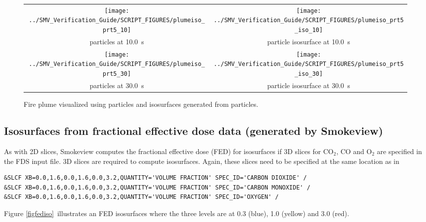 \documentclass[11pt,twoside]{book}
\begin{document}
\begin{figure}[bph]
\begin{center}
\begin{tabular}{cc}
\texttt{[image: ../SMV\_Verification\_Guide/SCRIPT\_FIGURES/plumeiso\_prt5\_10]}&
\texttt{[image: ../SMV\_Verification\_Guide/SCRIPT\_FIGURES/plumeiso\_prt5\_iso\_10]}\\
particles at 10.0~s&particle isosurface at 10.0~s\\
\texttt{[image: ../SMV\_Verification\_Guide/SCRIPT\_FIGURES/plumeiso\_prt5\_30]}&
\texttt{[image: ../SMV\_Verification\_Guide/SCRIPT\_FIGURES/plumeiso\_prt5\_iso\_30]}\\
particles at 30.0~s&particle isosurface at 30.0~s\\
\end{tabular}
\end{center}
\caption{Fire plume visualized using particles and isosurfaces
generated from  particles.}
\label{figisoparticle}%
\end{figure}

\subsection{Isosurfaces from fractional effective dose data (generated by Smokeview)}
As with 2D slices, Smokeview computes the fractional effective dose (FED) for isosurfaces
if 3D slices for $\mathrm{CO_2}$, CO and $\mathrm{O_2}$ are
specified in the FDS input file.  3D slices are required to compute isosurfaces.
Again, these slices need to be specified at the
same location as in
\begin{lstlisting}
&SLCF XB=0.0,1.6,0.0,1.6,0.0,3.2,QUANTITY='VOLUME FRACTION' SPEC_ID='CARBON DIOXIDE' /
&SLCF XB=0.0,1.6,0.0,1.6,0.0,3.2,QUANTITY='VOLUME FRACTION' SPEC_ID='CARBON MONOXIDE' /
&SLCF XB=0.0,1.6,0.0,1.6,0.0,3.2,QUANTITY='VOLUME FRACTION' SPEC_ID='OXYGEN' /
\end{lstlisting}
Figure \ref{figfediso}\ illustrates
an FED isosurfaces where the three levels are at 0.3 (blue), 1.0 (yellow) and 3.0 (red).
\end{document}
